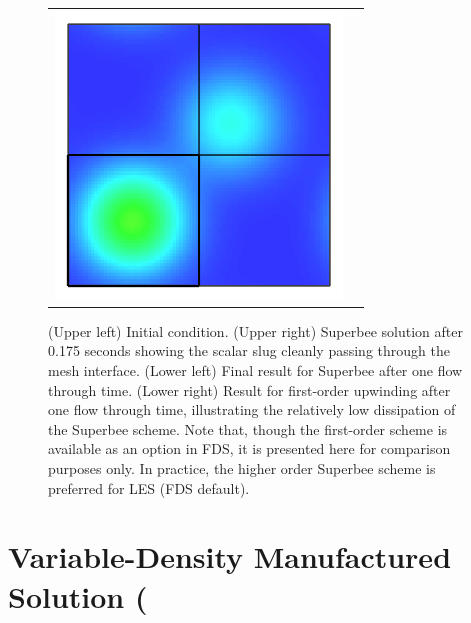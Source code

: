\documentclass[11pt]{book}
\begin{document}
\begin{figure}[t]
\begin{tabular}{rl}
      \includegraphics[width=3in]{SCRIPT_FIGURES/move_slug_FL1_tf} \\
   \end{tabular}
   \caption[Multi-mesh square wave transport]{(Upper left) Initial condition. (Upper right) Superbee solution after 0.175 seconds showing the scalar slug cleanly passing through the mesh interface. (Lower left) Final result for Superbee after one flow through time.  (Lower right) Result for first-order upwinding after one flow through time, illustrating the relatively low dissipation of the Superbee scheme.  Note that, though the first-order scheme is available as an option in FDS, it is presented here for comparison purposes only.  In practice, the higher order Superbee scheme is preferred for LES (FDS default).}
   \label{fig_move_slug}
\end{figure}

\clearpage

\section{Variable-Density Manufactured Solution (\texorpdfstring{})}
\end{document}
